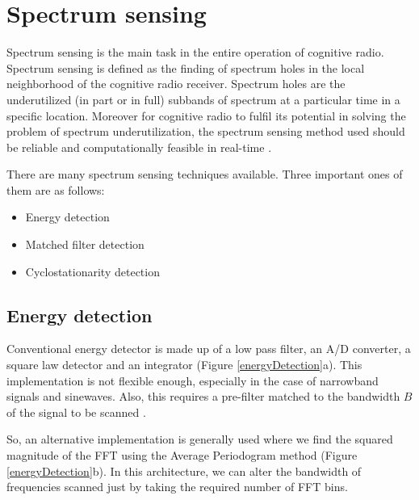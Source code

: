 \chapter{Spectrum sensing}

Spectrum sensing is the main task in the entire operation of cognitive
radio. Spectrum sensing is defined as the finding of spectrum holes in 
the local neighborhood of the cognitive radio receiver. Spectrum holes are the
underutilized (in part or in full) subbands of spectrum at a particular time
in a specific location. Moreover for cognitive radio to fulfil its potential
in solving the problem of spectrum underutilization, the spectrum sensing 
method used should be reliable and computationally feasible in real-time 
\cite{haykin09}.

There are many spectrum sensing techniques available. Three important ones of
them are as follows:
\begin{itemize}
    \item Energy detection
    \item Matched filter detection
    \item Cyclostationarity detection
\end{itemize}

\section{Energy detection}

Conventional energy detector is made up of a low pass filter, an A/D 
converter, a square law detector and an integrator (Figure 
\ref{energyDetection}a). This implementation is not flexible enough, 
especially in the case of narrowband signals and sinewaves. Also, this 
requires a pre-filter matched to the bandwidth $B$ of the signal to be scanned
\cite{cabric06}.

So, an alternative implementation is generally used where we find the squared 
magnitude of the FFT using the Average Periodogram method (Figure 
\ref{energyDetection}b). In this architecture, we can alter the bandwidth of
frequencies scanned just by taking
the required number of FFT bins. 

